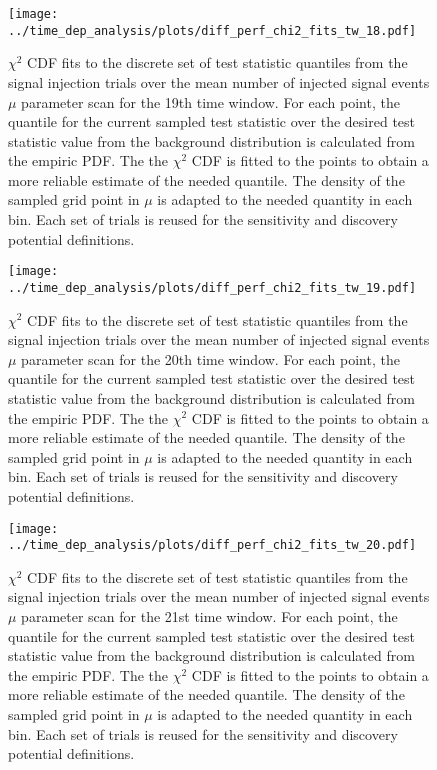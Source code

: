 \begin{figure}[H]
  \centering
  \texttt{[image: ../time\_dep\_analysis/plots/diff\_perf\_chi2\_fits\_tw\_18.pdf]}
  \caption[$\chi^2$ CDF fits for the 19th time window differential performance]{
     $\chi^2$ CDF fits to the discrete set of test statistic quantiles from the signal injection trials over the mean number of injected signal events $\mu$ parameter scan for the 19th time window.
     For each point, the quantile for the current sampled test statistic over the desired test statistic value from the background distribution is calculated from the empiric PDF.
     The the $\chi^2$ CDF is fitted to the points to obtain a more reliable estimate of the needed quantile.
     The density of the sampled grid point in $\mu$ is adapted to the needed quantity in each bin.
     Each set of trials is reused for the sensitivity and discovery potential definitions.
  }
  \label{fig:diff_perf_chi2_fits_tw_18}
\end{figure}
\begin{figure}[H]
  \centering
  \texttt{[image: ../time\_dep\_analysis/plots/diff\_perf\_chi2\_fits\_tw\_19.pdf]}
  \caption[$\chi^2$ CDF fits for the 20th time window differential performance]{
     $\chi^2$ CDF fits to the discrete set of test statistic quantiles from the signal injection trials over the mean number of injected signal events $\mu$ parameter scan for the 20th time window.
     For each point, the quantile for the current sampled test statistic over the desired test statistic value from the background distribution is calculated from the empiric PDF.
     The the $\chi^2$ CDF is fitted to the points to obtain a more reliable estimate of the needed quantile.
     The density of the sampled grid point in $\mu$ is adapted to the needed quantity in each bin.
     Each set of trials is reused for the sensitivity and discovery potential definitions.
  }
  \label{fig:diff_perf_chi2_fits_tw_19}
\end{figure}
\begin{figure}[H]
  \centering
  \texttt{[image: ../time\_dep\_analysis/plots/diff\_perf\_chi2\_fits\_tw\_20.pdf]}
  \caption[$\chi^2$ CDF fits for the 21st time window differential performance]{
     $\chi^2$ CDF fits to the discrete set of test statistic quantiles from the signal injection trials over the mean number of injected signal events $\mu$ parameter scan for the 21st time window.
     For each point, the quantile for the current sampled test statistic over the desired test statistic value from the background distribution is calculated from the empiric PDF.
     The the $\chi^2$ CDF is fitted to the points to obtain a more reliable estimate of the needed quantile.
     The density of the sampled grid point in $\mu$ is adapted to the needed quantity in each bin.
     Each set of trials is reused for the sensitivity and discovery potential definitions.
  }
  \label{fig:diff_perf_chi2_fits_tw_20}
\end{figure}


